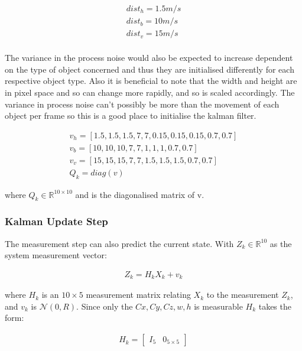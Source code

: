 \documentclass[11pt,twoside]{report}
\begin{document}
\begin{equation}
\begin{aligned}
dist_{h} = 1.5m/s \\
dist_{b} = 10 m/s \\
dist_{v} = 15 m/s \\
\end{aligned}
\end{equation}

The variance in the process noise would also be expected to increase dependent on the type of object concerned and thus they are initialised differently for each respective object type. Also it is beneficial to note that the width and height are in pixel space and so can change more rapidly, and so is scaled accordingly. The variance in process noise can't possibly be more than the movement of each object per frame so this is a good place to initialise the kalman filter.

\begin{equation}
\begin{aligned}
v_{h} = [1.5,1.5,1.5,7,7,0.15,0.15,0.15,0.7,0.7] \\
v_{b} = [10,10,10,7,7,1,1,1,0.7,0.7] \\
v_{v} = [15,15,15,7,7,1.5,1.5,1.5,0.7,0.7] \\
Q_{k} = diag(v)
\end{aligned}
\end{equation}

where $Q_{k} \in \mathbb{R}^{10 \times 10}$ and is the diagonalised matrix of v.

\subsubsection{Kalman Update Step}

The measurement step can also predict the current state. With $Z_{k} \in \mathbb{R}^{10}$ as the system measurement vector:

\begin{equation}
\begin{aligned}
Z_{k} =  H_{k} X_{k} + v_{k}
\end{aligned}
\end{equation}

where $H_{k}$ is an $10 \times 5$ measurement matrix relating $X_{k}$ to the measurement $Z_{k}$, and $v_{k}$ is $\mathcal{N}(0,R)$. Since only the $Cx,Cy,Cz,w,h$ is measurable $H_{k}$ takes the form:

\begin{equation}
\begin{aligned}
H_{k} = 
\begin{bmatrix}
I_{5} &  0_{5 \times 5}
\end{bmatrix}
\end{aligned}
\end{equation}
\end{document}
